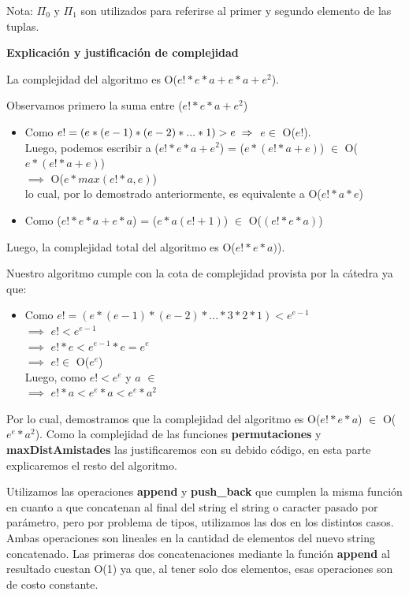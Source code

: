 \documentclass[11pt]{article}
\begin{document}
\vspace{1mm}
Nota: $\Pi_0$ y $\Pi_1$ son utilizados para referirse al primer y segundo elemento de las tuplas.

\vspace{3mm}
\begin{center}
\textbf{Explicación y justificación de complejidad} \\ 
\end{center} 

La complejidad del algoritmo es O($e!*e*a + e*a + e^{2}$).

Observamos primero la suma entre ($e!*e*a + e^{2}$)
\begin{itemize}
\item Como $e! = (e*(e-1)*(e-2)*...*1) > e \\ \implies $ $e \in$ O($e!$). \\ Luego, podemos escribir a 
  ($e!*e*a + e^2$) = ($e *(e!*a + e)$) $\in$ O($e *(e!*a + e)$) \\ $\implies$ O($e*max(e!*a, e)$) \\ lo cual, por lo demostrado anteriormente, es equivalente a O($e!*a*e$)
\item Como ($e!*e*a + e*a$) = ($e*a (e! + 1)$) $\in$ O($(e!*e*a)$)
\end{itemize}
Luego, la complejidad total del algoritmo es O($e!*e*a)$).

Nuestro algoritmo cumple con la cota de complejidad provista por la cátedra ya que:
\begin{itemize}
  \item Como $e! = (e*(e-1)*(e-2)*...*3*2*1) < e^{e-1}$ \\ $\implies$ $e! < e^{e-1}$ \\ $\implies$ $e!*e < e^{e-1}*e 
    = e^{e}$ \\ $\implies$ $e! \in$ O($e^e$) \\
    Luego, como $e! < e^e$ y $a$ $\in$ \\ $\implies$ $e!*a < e^e*a < e^e*a^2$
\end{itemize}
Por lo cual, demostramos que la complejidad del algoritmo es O($e!*e*a$) $\in$ O($e^e*a^2$).
Como la complejidad de las funciones \textbf{permutaciones} 
y \textbf{maxDistAmistades} las justificaremos con su debido código, en esta parte explicaremos el resto del 
algoritmo. 

Utilizamos las operaciones \textbf{append} y \textbf{push\_back} que cumplen la misma función en cuanto a que
concatenan al final del string el string o caracter pasado por parámetro, pero por problema de tipos, 
utilizamos las dos en los distintos casos. Ambas operaciones son lineales en la cantidad de elementos del nuevo string concatenado.
Las primeras dos concatenaciones mediante la función \textbf{append} al resultado cuestan O(1) ya que, al 
tener solo dos elementos, esas operaciones son de costo constante.
\end{document}
